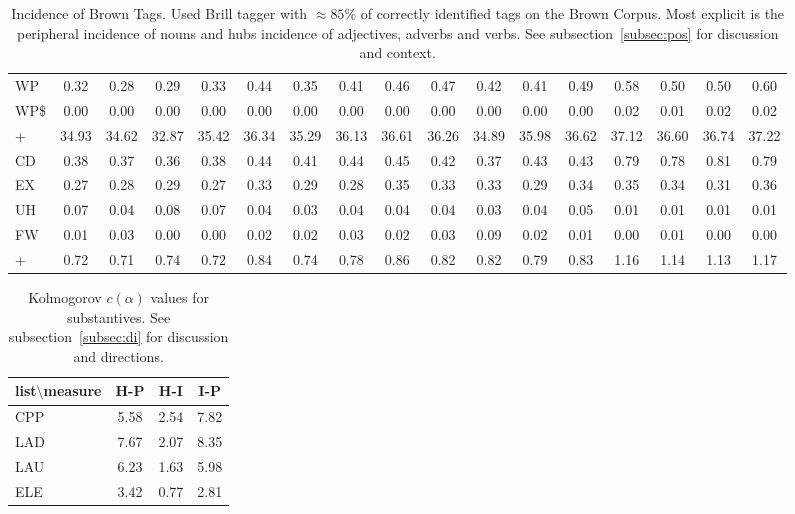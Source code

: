 \documentclass[%
 aip,
 jmp,%
 amsmath,amssymb,
 reprint,%
 floatfix,
]{revtex4-1}
\begin{document}
\begin{table}
\begin{tabular}{|l|| c|c|c|c||  c|c|c|c||   c|c|c|c||   c|c|c|c|}
WP & 0.32 & 0.28 & 0.29 & 0.33 & 0.44 & 0.35 & 0.41 & 0.46 & 0.47 & 0.42 & 0.41 & 0.49 & 0.58 & 0.50 & 0.50 & 0.60\\
WP\$ & 0.00 & 0.00 & 0.00 & 0.00 & 0.00 & 0.00 & 0.00 & 0.00 & 0.00 & 0.00 & 0.00 & 0.00 & 0.02 & 0.01 & 0.02 & 0.02\\\hline
+ & 34.93 & 34.62 & 32.87 & 35.42 & 36.34 & 35.29 & 36.13 & 36.61 & 36.26 & 34.89 & 35.98 & 36.62 & 37.12 & 36.60 & 36.74 & 37.22\\\hline\hline
CD & 0.38 & 0.37 & 0.36 & 0.38 & 0.44 & 0.41 & 0.44 & 0.45 & 0.42 & 0.37 & 0.43 & 0.43 & 0.79 & 0.78 & 0.81 & 0.79\\
EX & 0.27 & 0.28 & 0.29 & 0.27 & 0.33 & 0.29 & 0.28 & 0.35 & 0.33 & 0.33 & 0.29 & 0.34 & 0.35 & 0.34 & 0.31 & 0.36\\
UH & 0.07 & 0.04 & 0.08 & 0.07 & 0.04 & 0.03 & 0.04 & 0.04 & 0.04 & 0.03 & 0.04 & 0.05 & 0.01 & 0.01 & 0.01 & 0.01\\
FW & 0.01 & 0.03 & 0.00 & 0.00 & 0.02 & 0.02 & 0.03 & 0.02 & 0.03 & 0.09 & 0.02 & 0.01 & 0.00 & 0.01 & 0.00 & 0.00\\\hline
+ & 0.72 & 0.71 & 0.74 & 0.72 & 0.84 & 0.74 & 0.78 & 0.86 & 0.82 & 0.82 & 0.79 & 0.83 & 1.16 & 1.14 & 1.13 & 1.17\\\hline\hline
  \end{tabular}
  \caption{Incidence of Brown Tags. Used Brill tagger with $\approx 85\%$ of correctly identified tags on the Brown Corpus. Most explicit is the peripheral incidence of nouns and hubs incidence of adjectives, adverbs and verbs. See subsection~\ref{subsec:pos} for discussion and context.}
  \label{tab:pos}
\end{table}



\begin{table}
  \centering
    \small
\setlength{\tabcolsep}{.26667em}
  \begin{tabular}{|l|| c|c|c|}\hline
list$\setminus$measure & H-P & H-I & I-P \\\hline
CPP & 5.58 & 2.54 & 7.82 \\\hline
LAD & 7.67 & 2.07 & 8.35 \\\hline
LAU & 6.23 & 1.63 & 5.98 \\\hline
ELE & 3.42 & 0.77 & 2.81 \\\hline
  \end{tabular}
  \caption{Kolmogorov $c(\alpha)$ values for substantives. See subsection~\ref{subsec:di} for discussion and directions.}
  \label{tab:kolSub}
\end{table}
\end{document}

